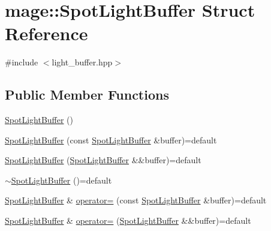 \hypertarget{structmage_1_1_spot_light_buffer}{}\section{mage\+:\+:Spot\+Light\+Buffer Struct Reference}
\label{structmage_1_1_spot_light_buffer}


{\ttfamily \#include $<$light\+\_\+buffer.\+hpp$>$}

\subsection*{Public Member Functions}
\begin{DoxyCompactItemize}
\item 
\hyperlink{structmage_1_1_spot_light_buffer_a862141be0a9dfe1fd3117141924650d5}{Spot\+Light\+Buffer} ()
\item 
\hyperlink{structmage_1_1_spot_light_buffer_a572e805bf8eef2a1183162ae68877ade}{Spot\+Light\+Buffer} (const \hyperlink{structmage_1_1_spot_light_buffer}{Spot\+Light\+Buffer} \&buffer)=default
\item 
\hyperlink{structmage_1_1_spot_light_buffer_a0dd63c65417578b6001b1c7f2195452c}{Spot\+Light\+Buffer} (\hyperlink{structmage_1_1_spot_light_buffer}{Spot\+Light\+Buffer} \&\&buffer)=default
\item 
\hyperlink{structmage_1_1_spot_light_buffer_aabbc92532299057fb4d649b1a9bcc605}{$\sim$\+Spot\+Light\+Buffer} ()=default
\item 
\hyperlink{structmage_1_1_spot_light_buffer}{Spot\+Light\+Buffer} \& \hyperlink{structmage_1_1_spot_light_buffer_ac2655ea3a51554f3c1b5e71afbc737b2}{operator=} (const \hyperlink{structmage_1_1_spot_light_buffer}{Spot\+Light\+Buffer} \&buffer)=default
\item 
\hyperlink{structmage_1_1_spot_light_buffer}{Spot\+Light\+Buffer} \& \hyperlink{structmage_1_1_spot_light_buffer_abbc27ec6784066dae03ee9f68c71ffea}{operator=} (\hyperlink{structmage_1_1_spot_light_buffer}{Spot\+Light\+Buffer} \&\&buffer)=default
\end{DoxyCompactItemize}
